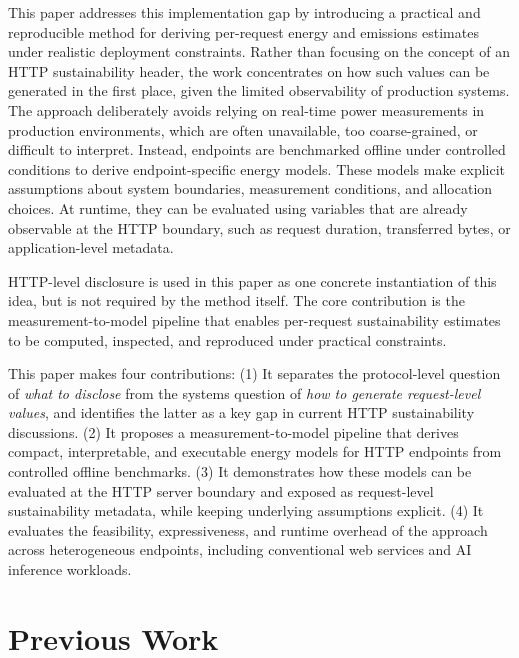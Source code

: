 This paper addresses this implementation gap by introducing a practical and
reproducible method for deriving per-request energy and emissions estimates
under realistic deployment constraints. Rather than focusing on the concept of
an HTTP sustainability header, the work concentrates on how such values
can be generated in the first place, given the limited observability of
production systems. The approach deliberately avoids relying on real-time power measurements in
production environments, which are often unavailable, too coarse-grained, or
difficult to interpret. Instead, endpoints are benchmarked offline under
controlled conditions to derive endpoint-specific energy models.
These models make explicit assumptions about system boundaries, measurement
conditions, and allocation choices. At runtime, they can be evaluated using
variables that are already observable at the HTTP boundary, such as request
duration, transferred bytes, or application-level metadata.

HTTP-level disclosure is used in this paper as one concrete instantiation of
this idea, but is not required by the method itself. The core contribution is
the measurement-to-model pipeline that enables per-request sustainability
estimates to be computed, inspected, and reproduced under practical
constraints.

This paper makes four contributions:
(1) It separates the protocol-level question of \emph{what to disclose} from
the systems question of \emph{how to generate request-level values}, and
identifies the latter as a key gap in current HTTP sustainability discussions. (2) It proposes a measurement-to-model pipeline that derives compact,
interpretable, and executable energy models for HTTP endpoints from controlled
offline benchmarks. (3) It demonstrates how these models can be evaluated at the HTTP server boundary and exposed as request-level sustainability metadata, while keeping
underlying assumptions explicit. (4) It evaluates the feasibility, expressiveness, and runtime overhead of the
approach across heterogeneous endpoints, including conventional web services
and AI inference workloads.



\section{Previous Work}

